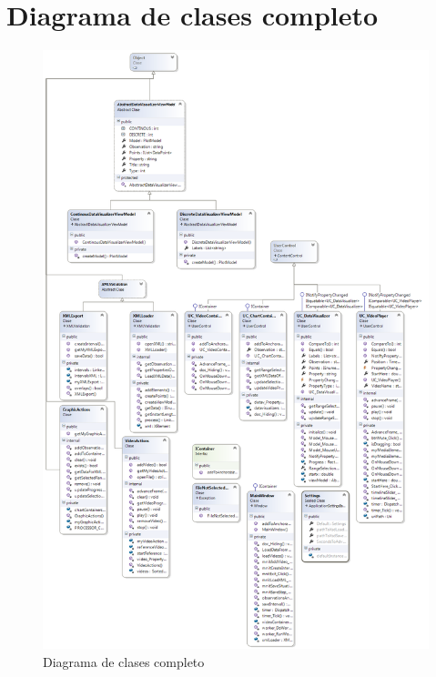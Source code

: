 \chapter{Diagrama de clases completo}
\begin{figure}[h]
\centering
\includegraphics[width=1.0\linewidth]{./Figures/ClassDiagramExpanded}
\caption{Diagrama de clases completo}
\label{fig:ClassDiagramExpanded}
\end{figure}
